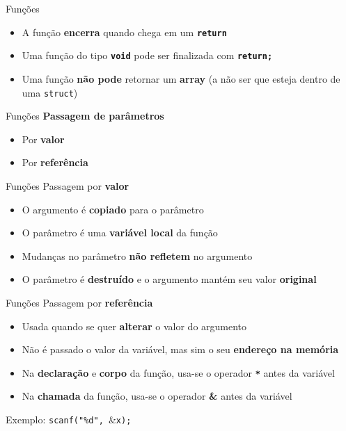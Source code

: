 \documentclass[10pt]{beamer}
\begin{document}
\begin{frame}{Funções}
  \large
  \begin{itemize}
    \item A função \textbf{encerra} quando chega em um \textbf{\texttt{return}}
    \item Uma função do tipo \textbf{\texttt{void}} pode ser finalizada com \textbf{\texttt{return;}}
    \item Uma função \textbf{não pode} retornar um \textbf{array} (a não ser que esteja dentro de uma \texttt{struct})
  \end{itemize}
\end{frame}

\begin{frame}{Funções}
  \huge
  \textbf{Passagem de parâmetros}
  \vfill
  \begin{itemize}
    \item Por \textbf{valor}
    \item Por \textbf{referência}
  \end{itemize}
\end{frame}

\begin{frame}{Funções}
  \huge
  Passagem por \textbf{valor}
  \vfill
  \Large
  \begin{itemize}
    \item O argumento é \textbf{copiado} para o parâmetro
    \item O parâmetro é uma \textbf{variável local} da função
    \item Mudanças no parâmetro \textbf{não refletem} no argumento
    \item O parâmetro é \textbf{destruído} e o argumento mantém seu valor \textbf{original}
  \end{itemize}

\end{frame}

\begin{frame}[fragile]{Funções}
  \huge
  Passagem por \textbf{referência}
  \vfill
  \large
  \begin{itemize}
    \item Usada quando se quer \textbf{alterar} o valor do argumento
    \item Não é passado o valor da variável, mas sim o seu \textbf{endereço na memória}
    \item Na \textbf{declaração} e \textbf{corpo} da função, usa-se o operador \textbf{\texttt{*}} antes da variável
    \item Na \textbf{chamada} da função, usa-se o operador \textbf{\&} antes da variável
  \end{itemize}
  \vfill
  \large
  Exemplo: \texttt{scanf("\%d", }\&\texttt{x);}
\end{frame}
\end{document}
